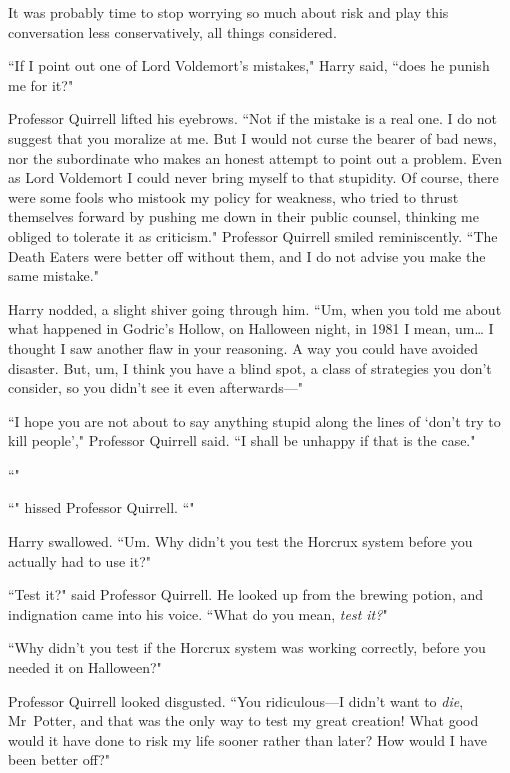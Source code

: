 It was probably time to stop worrying so much about risk and play this conversation less conservatively, all things considered.

``If I point out one of Lord Voldemort's mistakes," Harry said, ``does he punish me for it?"

Professor Quirrell lifted his eyebrows. ``Not if the mistake is a real one. I do not suggest that you moralize at me. But I would not curse the bearer of bad news, nor the subordinate who makes an honest attempt to point out a problem. Even as Lord Voldemort I could never bring myself to that stupidity. Of course, there were some fools who mistook my policy for weakness, who tried to thrust themselves forward by pushing me down in their public counsel, thinking me obliged to tolerate it as criticism." Professor Quirrell smiled reminiscently. ``The Death Eaters were better off without them, and I do not advise you make the same mistake."

Harry nodded, a slight shiver going through him. ``Um, when you told me about what happened in Godric's Hollow, on Halloween night, in 1981 I mean, um{\ldots} I thought I saw another flaw in your reasoning. A way you could have avoided disaster. But, um, I think you have a blind spot, a class of strategies you don't consider, so you didn't see it even afterwards—"

``I hope you are not about to say anything stupid along the lines of `don't try to kill people'," Professor Quirrell said. ``I shall be unhappy if that is the case."

``"

``" hissed Professor Quirrell. ``"

Harry swallowed. ``Um. Why didn't you test the Horcrux system before you actually had to use it?"

``Test it?" said Professor Quirrell. He looked up from the brewing potion, and indignation came into his voice. ``What do you mean, \emph{test it?}"

``Why didn't you test if the Horcrux system was working correctly, before you needed it on Halloween?"

Professor Quirrell looked disgusted. ``You ridiculous—I didn't want to \emph{die}, Mr~Potter, and that was the only way to test my great creation! What good would it have done to risk my life sooner rather than later? How would I have been better off?"

